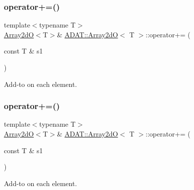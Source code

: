 \subsubsection{\texorpdfstring{operator+=()}{operator+=()}\hspace{0.1cm}{\footnotesize\ttfamily [5/6]}}
{\footnotesize\ttfamily template$<$typename T$>$ \\
\mbox{\hyperlink{classADAT_1_1Array2dO}{Array2dO}}$<$T$>$\& \mbox{\hyperlink{classADAT_1_1Array2dO}{A\+D\+A\+T\+::\+Array2dO}}$<$ T $>$\+::operator+= (\begin{DoxyParamCaption}\item[{const T \&}]{s1 }\end{DoxyParamCaption})\hspace{0.3cm}{\ttfamily [inline]}}



Add-\/to on each element. 

\mbox{\label{classADAT_1_1Array2dO_ae36484e0516c671683a97079f32bd6d8}} 
\subsubsection{\texorpdfstring{operator+=()}{operator+=()}\hspace{0.1cm}{\footnotesize\ttfamily [6/6]}}
{\footnotesize\ttfamily template$<$typename T$>$ \\
\mbox{\hyperlink{classADAT_1_1Array2dO}{Array2dO}}$<$T$>$\& \mbox{\hyperlink{classADAT_1_1Array2dO}{A\+D\+A\+T\+::\+Array2dO}}$<$ T $>$\+::operator+= (\begin{DoxyParamCaption}\item[{const T \&}]{s1 }\end{DoxyParamCaption})\hspace{0.3cm}{\ttfamily [inline]}}



Add-\/to on each element. 

\mbox{\label{classADAT_1_1Array2dO_a16fa54fe6c722762ce47b1d9f56b195a}} 
